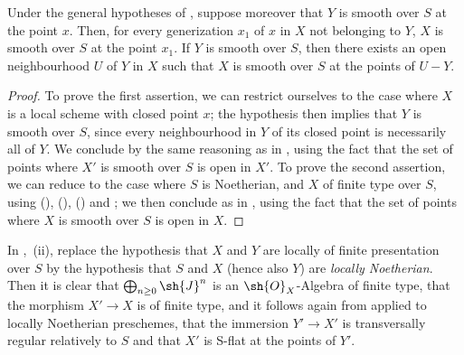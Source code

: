 \begin{corollary}[19.4.9]
\label{IV.19.4.9}
Under the general hypotheses of , suppose moreover that $Y$ is smooth over $S$ at the point $x$.
Then, for every generization $x_1$ of $x$ in $X$ not belonging to $Y$, $X$ is smooth over $S$ at the point $x_1$.
If $Y$ is smooth over $S$, then there exists an open neighbourhood $U$ of $Y$ in $X$ such that $X$ is smooth over $S$ at the points of $U-Y$.
\end{corollary}

\begin{proof}
To prove the first assertion, we can restrict ourselves to the case where $X$ is a local scheme with closed point $x$; the hypothesis then implies that $Y$ is smooth over $S$, since every neighbourhood in $Y$ of its closed point is necessarily all of $Y$. We conclude by the same reasoning as in , using the fact that the set of points where $X'$ is smooth over $S$ is open in $X'$.
To prove the second assertion, we can reduce to the case where $S$ is Noetherian, and $X$ of finite type over $S$, using (), (), () and ; we then conclude as in , using the fact that the set of points where $X$ is smooth over $S$ is open in $X$.
\end{proof}

\begin{remark}[19.4.10]
\label{IV.19.4.10}
In ,~(ii), replace the hypothesis that $X$ and $Y$ are locally of finite presentation over $S$ by the hypothesis that $S$ and $X$ (hence also $Y$) are \emph{locally Noetherian}.
Then it is clear that $\bigoplus_{n\geq 0}\sh{J}^n$ is an $\sh{O}_X$-Algebra of finite type, that the morphism $X'\to X$ is of finite type, and it follows again from  applied to locally Noetherian preschemes, that the immersion $Y'\to X'$ is transversally regular relatively to $S$ and that $X'$ is S-flat at the points of $Y'$.
\end{remark}

